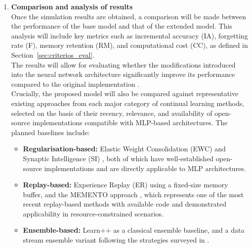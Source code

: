 \begin{enumerate}
    \item \textbf{Comparison and analysis of results} \\
    Once the simulation results are obtained, a comparison will be made between the 
    performance of the base model and that of the extended model. This analysis will 
    include key metrics such as incremental accuracy (IA), forgetting rate (F), memory 
    retention (RM), and computational cost (CC), as defined in 
    Section~\ref{sec:criterios_eval}. \\
    The results will allow for evaluating whether the modifications introduced into the 
    neural network architecture significantly improve its performance compared to the 
    original implementation \cite{bullinaria2009}. \\
    Crucially, the proposed model will also be compared against representative existing 
    approaches from each major category of continual learning methods, selected on the 
    basis of their recency, relevance, and availability of open-source implementations 
    compatible with MLP-based architectures. The planned baselines include:
    \begin{itemize}
        \item \textbf{Regularisation-based:} Elastic Weight Consolidation (EWC) 
        \cite{kirkpatrick2017overcoming} and Synaptic Intelligence (SI) 
        \cite{zenke2017continual}, both of which have well-established open-source 
        implementations and are directly applicable to MLP architectures.

        \item \textbf{Replay-based:} Experience Replay (ER) \cite{rolnick2019experience} 
        using a fixed-size memory buffer, and the MEMENTO approach 
        \cite{CERASUOLO2024}, which represents one of the most recent replay-based 
        methods with available code and demonstrated applicability in 
        resource-constrained scenarios.

        \item \textbf{Ensemble-based:} Learn++ \cite{polikar2001learn++} as a 
        classical ensemble baseline, and a data stream ensemble variant following 
        the strategies surveyed in \cite{krawczyk2017ensemble, gomes2017survey}.


\end{itemize}
\end{enumerate}
